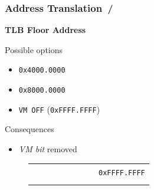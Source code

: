 \documentclass{beamer}
\begin{document}
\begin{frame}
	\frametitle{Address Translation \hspace{0pt plus 1 filll} \insertframenumber\,/\,\inserttotalframenumber}
	\begin{center}
		\begin{block}{\textbf{{\small TLB Floor Address}}}
			\begin{minipage}[t][11ex][b]{0.3\textwidth}
				\begin{scriptsize}
					Possible options
					\vspace{0.3em}
					\begin{itemize}
						\item \texttt{0x4000.0000}
						\item \texttt{0x8000.0000}
						\item \texttt{VM OFF} {\tiny (\texttt{0xFFFF.FFFF})}
					\end{itemize}
					\vspace{1em}
					Consequences
					\begin{itemize}
						\item \textit{VM bit} removed
					\end{itemize}
				\end{scriptsize}
			\end{minipage}
			\hspace{0pt plus 1 filll}
			\begin{minipage}{0.65\textwidth}
				\begin{figure}[h]
					\centering
					\renewcommand{\arraystretch}{0.6}
					\begin{tabular}{rrrcl}
						                                                  &                                                   &                                                    &                                                           & \multirow{2}{*}{\texttt{{\tiny 0xFFFF.FFFF}}} \\ \hhline{----~}
						\multicolumn{1}{l}{{\tiny $\downarrow$ Physical}} & \multirow{8}{*}{}                                 & \multicolumn{1}{r|}{}                              & \multicolumn{1}{c|}{\cellcolor{nord13}~~~~~~~~}           &                                               \\
						                                                  &                                                   & \multicolumn{1}{r|}{}                              & \multicolumn{1}{c|}{\cellcolor{nord13}}                   &                                               \\

\end{tabular}
\end{figure}
\end{minipage}
\end{block}
\end{center}
\end{frame}
\end{document}
